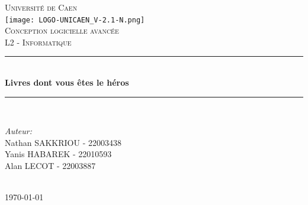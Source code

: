 \documentclass[12pt]{article}
\begin{document}
\begin{titlepage}

\newcommand{\HRule}{\rule{\linewidth}{0.5mm}} %

\center %
 

\textsc{\LARGE Université de Caen}\\[1.5cm] %
\texttt{[image: LOGO-UNICAEN\_V-2.1-N.png]}\\[1cm] %
\textsc{\Large Conception logicielle avancée}\\[0.5cm] %
\textsc{\large L2 - Informatique}\\[0.5cm] %


\HRule \\[0.4cm]
{ \huge \bfseries Livres dont vous êtes le héros}\\[0.4cm] %
\HRule \\[1.5cm]
 

\begin{minipage}{0.6\textwidth}

\begin{flushleft} \large
\center
\emph{Auteur:}\\
Nathan \textsc{SAKKRIOU} - 22003438\\ %
Yanis \textsc{HABAREK} - 22010593\\
Alan \textsc{LECOT} - 22003887
\end{flushleft}
\end{minipage}\\[1.5cm]

{\today}\\[2cm] %

\vfill %
\end{titlepage}
\end{document}
